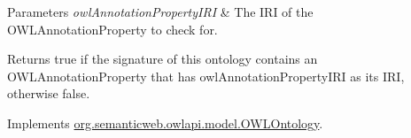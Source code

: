 \begin{DoxyParams}{Parameters}
{\em owl\-Annotation\-Property\-I\-R\-I} & The I\-R\-I of the O\-W\-L\-Annotation\-Property to check for. \\
\hline
\end{DoxyParams}
\begin{DoxyReturn}{Returns}
{\ttfamily true} if the signature of this ontology contains an O\-W\-L\-Annotation\-Property that has {\ttfamily owl\-Annotation\-Property\-I\-R\-I} as its I\-R\-I, otherwise {\ttfamily false}. 
\end{DoxyReturn}


Implements \hyperlink{interfaceorg_1_1semanticweb_1_1owlapi_1_1model_1_1_o_w_l_ontology_a4c9310943a436bd6b39e9d0e98a9bc9e}{org.\-semanticweb.\-owlapi.\-model.\-O\-W\-L\-Ontology}.

